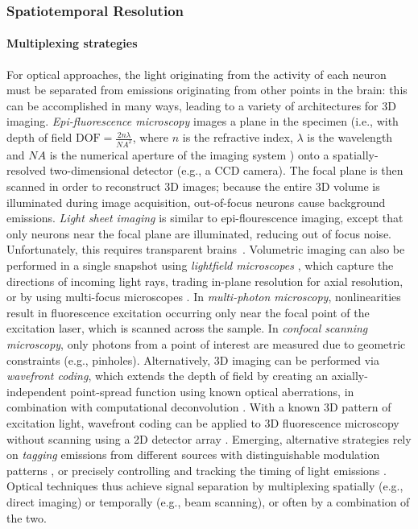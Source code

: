 \subsubsection{Spatiotemporal Resolution}

\paragraph{Multiplexing strategies}
For optical approaches, the light originating from the activity of each neuron must be separated from emissions originating from other points in the brain: this can be accomplished in many ways, leading to a variety of architectures for 3D imaging.
\emph{Epi-fluorescence microscopy} images a plane in the specimen (i.e., with depth of field $\text{DOF} = \frac{2n \lambda}{NA^2}$, where $n$ is the refractive index, $\lambda$ is the wavelength and $NA$ is the numerical aperture of the imaging system \cite{quirin2013instantaneous}) onto a spatially-resolved two-dimensional detector (e.g., a CCD camera). 
The focal plane is then scanned in order to reconstruct 3D images; because the entire 3D volume is illuminated during image acquisition, out-of-focus neurons cause background emissions. 
\emph{Light sheet imaging} is similar to epi-flourescence imaging, except that only neurons near the focal plane are illuminated, reducing out of focus noise. Unfortunately, this requires transparent brains~\cite{ahrens13}. 
Volumetric imaging can also be performed in a single snapshot using \emph{lightfield microscopes} \cite{levoy2009recording, broxton2013wave}, which capture the directions of incoming light rays, trading in-plane resolution for axial resolution, or by using multi-focus microscopes \cite{abrahamsson2012fast}. 
In \emph{multi-photon microscopy}, nonlinearities result in fluorescence excitation occurring only near the focal point of the excitation laser, which is scanned across the sample. 
In \emph{confocal scanning microscopy}, only photons from a point of interest are measured due to geometric constraints (e.g., pinholes). 
Alternatively, 3D imaging can be performed via \emph{wavefront coding}, which extends the depth of field by creating an axially-independent point-spread function using known optical aberrations, in combination with computational deconvolution \cite{dowski1995extended}. 
With a known 3D pattern of excitation light, wavefront coding can be applied to 3D fluorescence microscopy without scanning using a 2D detector array \cite{quirin2013instantaneous}. 
Emerging, alternative strategies rely on \emph{tagging} emissions from different sources with distinguishable modulation patterns \cite{wang12, diebold2013digitally, ducros2013encoded, yin2006frequency, wu2006frequency}, or precisely controlling and tracking the timing of light emissions \cite{cheng2011simultaneous}.
Optical techniques thus achieve signal separation by multiplexing spatially (e.g., direct imaging) or temporally (e.g., beam scanning), or often by a combination of the two.

